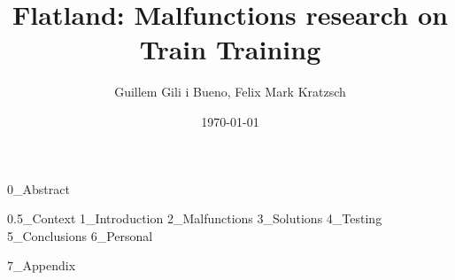 \documentclass{llncs}
\begin{document}
\title{Flatland: Malfunctions research on Train Training}
\author{Guillem Gili i Bueno, Felix Mark Kratzsch}
\date{\today}
\maketitle

{0_Abstract}

\setcounter{tocdepth}{2}
\tableofcontents
{0.5_Context}
{1_Introduction}
{2_Malfunctions}
{3_Solutions}
{4_Testing}
{5_Conclusions}
{6_Personal}


% 
{}

{7_Appendix}
\end{document}
